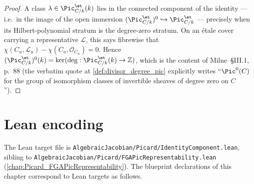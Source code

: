 \begin{proof}
  A class
  \(\lambda \in \Pic^{\et}_{C/k}(k)\) lies in the connected component of
  the identity --- i.e.\ in the image of the open immersion
  \((\Pic^{\et}_{C/k})^0\hookrightarrow\Pic^{\et}_{C/k}\) --- precisely
  when its Hilbert-polynomial stratum is the degree-zero stratum.
  On an \'etale cover carrying a representative \(\mathcal L\), this says
  fibrewise that
  \(\chi(C_u,\mathcal L_u)-\chi(C_u,\mathcal O_{C_u})=0\).
  Hence
  \((\Pic^{\et}_{C/k})^0(k)
    =\ker(\deg:\Pic^{\et}_{C/k}(k)\to\mathbb Z)\),
  which is the content of Milne~\S III.1, p.~88 (the verbatim quote
  at \cref{def:divisor_degree_pic} explicitly writes ``\(\Pic^0(C)\)
  for the group of isomorphism classes of invertible sheaves of degree
  zero on \(C\)'').
\end{proof}

\section{Lean encoding}
\label{sec:pic0_lean_encoding}

The Lean target file is
\texttt{AlgebraicJacobian/Picard/IdentityComponent.lean}, sibling to
\texttt{AlgebraicJacobian/Picard/FGAPicRepresentability.lean}
(\cref{chap:Picard_FGAPicRepresentability}). The blueprint declarations
of this chapter correspond to Lean targets as follows.

